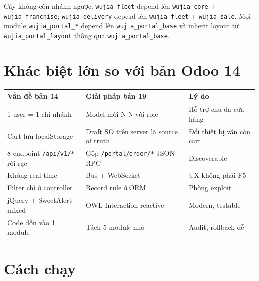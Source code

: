 Cây không còn nhánh ngược. \texttt{wujia\_fleet} depend lên \texttt{wujia\_core} + \texttt{wujia\_franchise}; \texttt{wujia\_delivery} depend lên \texttt{wujia\_fleet} + \texttt{wujia\_sale}. Mọi module \texttt{wujia\_portal\_*} depend lên \texttt{wujia\_portal\_base} và inherit layout từ \texttt{wujia\_portal\_layout} thông qua \texttt{wujia\_portal\_base}.

\section{Khác biệt lớn so với bản Odoo 14}

\begin{longtable}{p{5cm} p{5cm} p{4cm}}
\toprule
\textbf{Vấn đề bản 14} & \textbf{Giải pháp bản 19} & \textbf{Lý do} \\
\midrule
\endhead
1 user = 1 chi nhánh & Model mới N-N với role & Hỗ trợ chủ đa cửa hàng \\
\midrule
Cart lưu localStorage & Draft SO trên server là source of truth & Đổi thiết bị vẫn còn cart \\
\midrule
8 endpoint \texttt{/api/v1/*} rời rạc & Gộp \texttt{/portal/order/*} JSON-RPC & Discoverable \\
\midrule
Không real-time & Bus + WebSocket & UX không phải F5 \\
\midrule
Filter chỉ ở controller & Record rule ở ORM & Phòng exploit \\
\midrule
jQuery + SweetAlert mixed & OWL Interaction reactive & Modern, testable \\
\midrule
Code dồn vào 1 module & Tách 5 module nhỏ & Audit, rollback dễ \\
\bottomrule
\end{longtable}

\section{Cách chạy}

